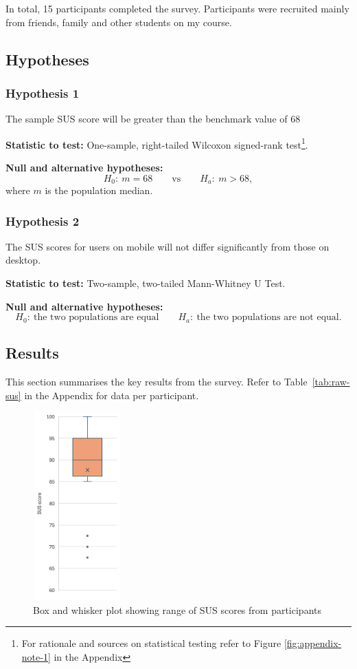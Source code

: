 In total, 15 participants completed the survey. Participants were recruited
mainly from friends, family and other students on my course.

\subsection{Hypotheses}

\subsubsection{Hypothesis 1}
The sample SUS score will be greater than the benchmark value of 68

\textbf{Statistic to test:} One-sample, right-tailed Wilcoxon signed-rank
test\footnote[1]{For rationale and sources on statistical testing refer to
Figure \ref{fig:appendix-note-1} in the Appendix}.

\textbf{Null and alternative hypotheses:}
\[
H_0:\ m = 68 \qquad\text{vs}\qquad H_a:\ m > 68,
\]
where \(m\) is the population median.

\subsubsection{Hypothesis 2}
The SUS scores for users on mobile will not differ significantly from those on
desktop.

\textbf{Statistic to test:} Two-sample, two-tailed Mann-Whitney U
Test\footnotemark[1].

\textbf{Null and alternative hypotheses:}
\[
H_0:\ \text{the two populations are equal} \qquad
H_a:\ \text{the two populations are not equal.}
\]

\subsection{Results}

This section summarises the key results from the survey. Refer to
Table~\ref{tab:raw-sus} in the Appendix for data per participant.

\begin{figure}[H]
    \centering
    \includegraphics[width=0.3\textwidth]{contents/part-4/fig4/box-whisker.png}
    \caption{Box and whisker plot showing range of SUS scores from participants}
    \label{fig:box-whisker}
\end{figure}

